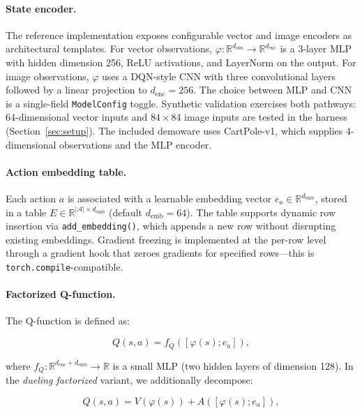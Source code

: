 \documentclass{article}
\begin{document}
\paragraph{State encoder.}
The reference implementation exposes configurable vector and image encoders as
architectural templates. For vector observations,
$\varphi: \mathbb{R}^{d_\text{obs}} \to \mathbb{R}^{d_\text{enc}}$ is a 3-layer
MLP with hidden dimension 256, ReLU activations, and LayerNorm on the output.
For image observations, $\varphi$ uses a DQN-style CNN with three convolutional
layers followed by a linear projection to $d_\text{enc}=256$. The choice
between MLP and CNN is a single-field \texttt{ModelConfig} toggle. Synthetic
validation exercises both pathways: 64-dimensional vector inputs and
$84\times84$ image inputs are tested in the harness (Section~\ref{sec:setup}).
The included demoware uses CartPole-v1, which supplies 4-dimensional
observations and the MLP encoder.

\paragraph{Action embedding table.}
Each action $a$ is associated with a
learnable embedding vector $e_a \in \mathbb{R}^{d_\text{emb}}$, stored in a
table $E \in \mathbb{R}^{|\mathcal{A}| \times d_\text{emb}}$ (default
$d_\text{emb}=64$). The table supports dynamic row insertion via
\texttt{add\_embedding()}, which appends a new row without disrupting existing
embeddings. Gradient freezing is implemented at the per-row level through a
gradient hook that zeroes gradients for specified rows---this is
\texttt{torch.compile}-compatible.

\paragraph{Factorized Q-function.}
The Q-function is defined as:

\begin{equation}
Q(s,a) = f_Q([\varphi(s); e_a]), \label{eq:factorized}
\end{equation}

where $f_Q: \mathbb{R}^{d_\text{enc} + d_\text{emb}} \to \mathbb{R}$ is a
small MLP (two hidden layers of dimension 128). In the \emph{dueling
factorized} variant, we additionally decompose:

\begin{equation}
Q(s,a) = V(\varphi(s)) + A([\varphi(s); e_a]), \label{eq:dueling}
\end{equation}
\end{document}
